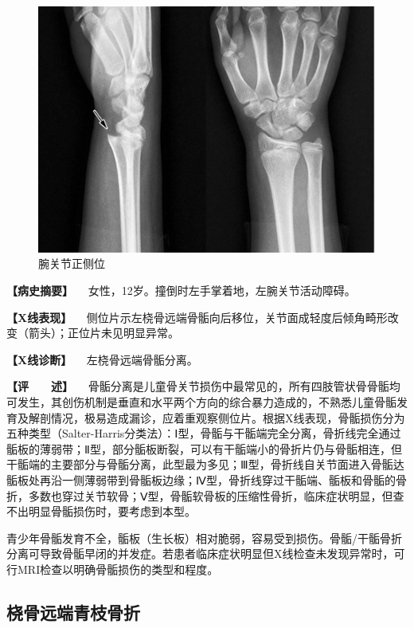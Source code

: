 \begin{figure}[!htbp]
 \centering
 \includegraphics{./images/Image00037.jpg}
 \captionsetup{justification=centering}
 \caption{腕关节正侧位}
 \label{fig2-3-10}
  \end{figure} 

\textbf{【病史摘要】} 　女性，12岁。撞倒时左手掌着地，左腕关节活动障碍。

\textbf{【X线表现】}
　侧位片示左桡骨远端骨骺向后移位，关节面成轻度后倾角畸形改变（箭头）；正位片未见明显异常。

\textbf{【X线诊断】} 　左桡骨远端骨骺分离。

\textbf{【评　　述】}
　骨骺分离是儿童骨关节损伤中最常见的，所有四肢管状骨骨骺均可发生，其创伤机制是垂直和水平两个方向的综合暴力造成的，不熟悉儿童骨骺发育及解剖情况，极易造成漏诊，应着重观察侧位片。根据X线表现，骨骺损伤分为五种类型（Salter-Harris分类法）：Ⅰ型，骨骺与干骺端完全分离，骨折线完全通过骺板的薄弱带；Ⅱ型，部分骺板断裂，可以有干骺端小的骨折片仍与骨骺相连，但干骺端的主要部分与骨骺分离，此型最为多见；Ⅲ型，骨折线自关节面进入骨骺达骺板处再沿一侧薄弱带到骨骺板边缘；Ⅳ型，骨折线穿过干骺端、骺板和骨骺的骨折，多数也穿过关节软骨；Ⅴ型，骨骺软骨板的压缩性骨折，临床症状明显，但查不出明显骨骺损伤时，要考虑到本型。

青少年骨骺发育不全，骺板（生长板）相对脆弱，容易受到损伤。骨骺/干骺骨折分离可导致骨骺早闭的并发症。若患者临床症状明显但X线检查未发现异常时，可行MRI检查以明确骨骺损伤的类型和程度。

\subsection{桡骨远端青枝骨折}

